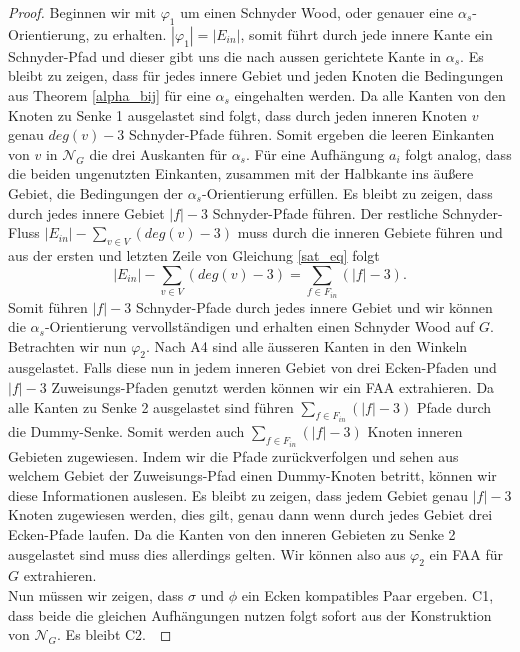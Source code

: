 \begin{proof}
Beginnen wir mit $\varphi_1$ um einen Schnyder Wood, oder genauer eine $\alpha_s$-Orientierung, zu erhalten. $|\varphi_1| = |E_{in}|$, somit führt durch jede innere Kante ein Schnyder-Pfad und dieser gibt uns die nach aussen gerichtete Kante in $\alpha_s$. Es bleibt zu zeigen, dass für jedes innere Gebiet und jeden Knoten die Bedingungen aus Theorem \ref{alpha_bij} für eine $\alpha_s$ eingehalten werden. Da alle Kanten von den Knoten zu Senke 1 ausgelastet sind folgt, dass durch jeden inneren Knoten $v$ genau $deg(v)-3$ Schnyder-Pfade führen. Somit ergeben die leeren Einkanten von $v$ in $\mathcal{N}_G$ die drei Auskanten für $\alpha_s$. Für eine Aufhängung $a_i$ folgt analog, dass die beiden ungenutzten Einkanten, zusammen mit der Halbkante ins äußere Gebiet, die Bedingungen der $\alpha_s$-Orientierung erfüllen. Es bleibt zu zeigen, dass durch jedes innere Gebiet $|f|-3$ Schnyder-Pfade führen. Der restliche Schnyder-Fluss $|E_{in}| - \sum_{v \in V} (deg(v)-3)$ muss durch die inneren Gebiete führen und aus der ersten und letzten Zeile von Gleichung \ref{sat_eq} folgt $$|E_{in}| - \sum_{v \in V} (deg(v)-3) = \sum_{f \in F_{in}} (|f|-3).$$
Somit führen $|f|-3$ Schnyder-Pfade durch jedes innere Gebiet und wir können die $\alpha_s$-Orientierung vervollständigen und erhalten einen Schnyder Wood auf $G$.\\

Betrachten wir nun $\varphi_2$. Nach A4 sind alle äusseren Kanten in den Winkeln ausgelastet. Falls diese nun in jedem inneren Gebiet von drei Ecken-Pfaden und $|f|-3$ Zuweisungs-Pfaden genutzt werden können wir ein FAA extrahieren. Da alle Kanten zu Senke 2 ausgelastet sind führen $\sum_{f \in F_{in}} (|f|-3)$ Pfade durch die Dummy-Senke. Somit werden auch $\sum_{f \in F_{in}} (|f|-3)$ Knoten inneren Gebieten zugewiesen. Indem wir die Pfade zurückverfolgen und sehen aus welchem Gebiet der Zuweisungs-Pfad einen Dummy-Knoten betritt, können wir diese Informationen auslesen. Es bleibt zu zeigen, dass jedem Gebiet genau $|f|-3$ Knoten zugewiesen werden, dies gilt, genau dann wenn durch jedes Gebiet drei Ecken-Pfade laufen. Da die Kanten von den inneren Gebieten zu Senke 2 ausgelastet sind muss dies allerdings gelten. Wir können also aus $\varphi_2$ ein FAA für $G$ extrahieren. \\

Nun müssen wir zeigen, dass $\sigma$ und $\phi$ ein Ecken kompatibles Paar ergeben. C1, dass beide die gleichen Aufhängungen nutzen folgt sofort aus der Konstruktion von $\mathcal{N}_G$. Es bleibt C2.\


\end{proof}
